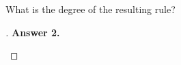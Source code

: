 \documentclass[12pt]{article}
\newenvironment{exercise}[2][Exercise]{\begin{trivlist}
\item[\hskip \labelsep {\bfseries #1}\hskip \labelsep {\bfseries #2.}]}{\end{trivlist}}
\begin{document}
\begin{exercise}{2}
	What is the degree of the resulting rule?
\end{exercise} %
\begin{proof}[]
	\textbf{Answer 2.} %
	\begin{quote}
	\end{quote}
\end{proof}
\end{document}
